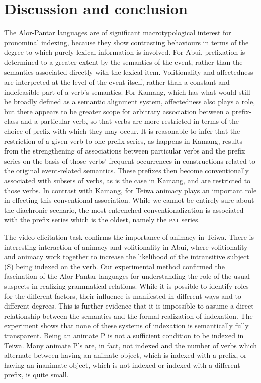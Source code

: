 \section{Discussion and conclusion}
\label{sec:10:6}
The Alor-Pantar languages are of significant macrotypological interest for pronominal indexing, because they show contrasting behaviours in terms of the degree to which purely lexical information is involved. For Abui, prefixation is determined to a greater extent by the semantics of the event, rather than the semantics associated directly with the lexical item. Volitionality and affectedness are interpreted at the level of the event itself, rather than a constant and indefeasible part of a verb's semantics. For Kamang, which has what would still be broadly defined as a semantic alignment system, affectedness also plays a role, but there appears to be greater scope for arbitrary association between a prefix-class and a particular verb, so that verbs are more restricted in terms of the choice of prefix with which they may occur. It is reasonable to infer that the restriction of a given verb to one prefix series, as happens in Kamang, results from the strengthening of associations between particular verbs and the prefix series on the basis of those verbs' frequent occurrences in constructions related to the original event-related semantics. These prefixes then become conventionally associated with subsets of verbs, as is the case in Kamang, and are restricted to those verbs. In contrast with Kamang, for Teiwa animacy plays an important role in effecting this conventional association. While we cannot be entirely sure about the diachronic scenario, the most entrenched conventionalization is associated with the prefix series which is the oldest, namely the \textsc{pat} series.

  The video elicitation task confirms the importance of animacy in Teiwa. There is interesting interaction of animacy and volitionality in Abui, where volitionality and animacy work together to increase the likelihood of the intransitive subject (S) being indexed on the verb. Our experimental method confirmed the fascination of the Alor-Pantar languages for understanding the role of the usual suspects in realizing grammatical relations. While it is possible to identify roles for the different factors, their influence is manifested in different ways and to different degrees. This is further evidence that it is impossible to assume a direct relationship between the semantics and the formal realization of indexation. The experiment shows that none of these systems of indexation is semantically fully transparent. Being an animate P is not a sufficient condition to be indexed in Teiwa. Many animate P's are, in fact, not indexed and the number of verbs which alternate between having an animate object, which is indexed with a prefix, or having an inanimate object, which is not indexed or indexed with a different prefix, is quite small.

